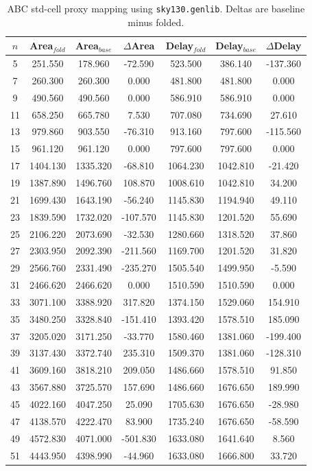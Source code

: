 \begin{table}[t]
\centering
\caption{ABC std-cell proxy mapping using \texttt{sky130.genlib}. Deltas are baseline minus folded.}
\label{tab:stdcell_sky130_genlib}
\begin{tabular}{ccccccc}
\hline
$n$ & Area$_{fold}$ & Area$_{base}$ & $\Delta$Area & Delay$_{fold}$ & Delay$_{base}$ & $\Delta$Delay \\
\hline
5 & 251.550 & 178.960 & -72.590 & 523.500 & 386.140 & -137.360 \\
7 & 260.300 & 260.300 & 0.000 & 481.800 & 481.800 & 0.000 \\
9 & 490.560 & 490.560 & 0.000 & 586.910 & 586.910 & 0.000 \\
11 & 658.250 & 665.780 & 7.530 & 707.080 & 734.690 & 27.610 \\
13 & 979.860 & 903.550 & -76.310 & 913.160 & 797.600 & -115.560 \\
15 & 961.120 & 961.120 & 0.000 & 797.600 & 797.600 & 0.000 \\
17 & 1404.130 & 1335.320 & -68.810 & 1064.230 & 1042.810 & -21.420 \\
19 & 1387.890 & 1496.760 & 108.870 & 1008.610 & 1042.810 & 34.200 \\
21 & 1699.430 & 1643.190 & -56.240 & 1145.830 & 1194.940 & 49.110 \\
23 & 1839.590 & 1732.020 & -107.570 & 1145.830 & 1201.520 & 55.690 \\
25 & 2106.220 & 2073.690 & -32.530 & 1280.660 & 1318.520 & 37.860 \\
27 & 2303.950 & 2092.390 & -211.560 & 1169.700 & 1201.520 & 31.820 \\
29 & 2566.760 & 2331.490 & -235.270 & 1505.540 & 1499.950 & -5.590 \\
31 & 2466.620 & 2466.620 & 0.000 & 1510.590 & 1510.590 & 0.000 \\
33 & 3071.100 & 3388.920 & 317.820 & 1374.150 & 1529.060 & 154.910 \\
35 & 3480.250 & 3328.840 & -151.410 & 1393.420 & 1578.510 & 185.090 \\
37 & 3205.020 & 3171.250 & -33.770 & 1580.460 & 1381.060 & -199.400 \\
39 & 3137.430 & 3372.740 & 235.310 & 1509.370 & 1381.060 & -128.310 \\
41 & 3609.160 & 3818.210 & 209.050 & 1486.660 & 1578.510 & 91.850 \\
43 & 3567.880 & 3725.570 & 157.690 & 1486.660 & 1676.650 & 189.990 \\
45 & 4022.160 & 4047.250 & 25.090 & 1705.630 & 1676.650 & -28.980 \\
47 & 4138.570 & 4222.470 & 83.900 & 1735.240 & 1676.650 & -58.590 \\
49 & 4572.830 & 4071.000 & -501.830 & 1633.080 & 1641.640 & 8.560 \\
51 & 4443.950 & 4398.990 & -44.960 & 1633.080 & 1666.800 & 33.720 \\
\hline
\end{tabular}
\end{table}
